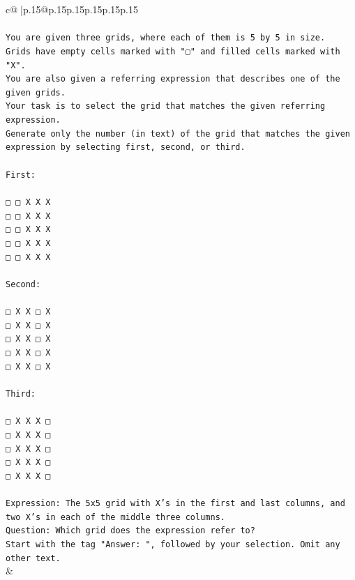 \documentclass{article}
\begin{document}
{\begin{supertabular}{c@{$\;$}|p{.15\linewidth}@{}p{.15\linewidth}p{.15\linewidth}p{.15\linewidth}p{.15\linewidth}p{.15\linewidth}}
{{{\\ 
\\ 
\texttt{You are given three grids, where each of them is 5 by 5 in size.} \\
\texttt{Grids have empty cells marked with "▢" and filled cells marked with "X".} \\
\texttt{You are also given a referring expression that describes one of the given grids.} \\
\texttt{Your task is to select the grid that matches the given referring expression.} \\
\texttt{Generate only the number (in text) of the grid that matches the given expression by selecting first, second, or third.} \\
\\ 
\texttt{First:} \\
\\ 
\texttt{□ □ X X X} \\
\texttt{□ □ X X X} \\
\texttt{□ □ X X X} \\
\texttt{□ □ X X X} \\
\texttt{□ □ X X X} \\
\\ 
\texttt{Second:} \\
\\ 
\texttt{□ X X □ X} \\
\texttt{□ X X □ X} \\
\texttt{□ X X □ X} \\
\texttt{□ X X □ X} \\
\texttt{□ X X □ X} \\
\\ 
\texttt{Third:} \\
\\ 
\texttt{□ X X X □} \\
\texttt{□ X X X □} \\
\texttt{□ X X X □} \\
\texttt{□ X X X □} \\
\texttt{□ X X X □} \\
\\ 
\texttt{Expression: The 5x5 grid with X's in the first and last columns, and two X's in each of the middle three columns.} \\
\texttt{Question: Which grid does the expression refer to?} \\
\texttt{Start with the tag "Answer: ", followed by your selection. Omit any other text.} \\
            }
        }
    }
    & \\ \\


\end{supertabular}}
\end{document}
